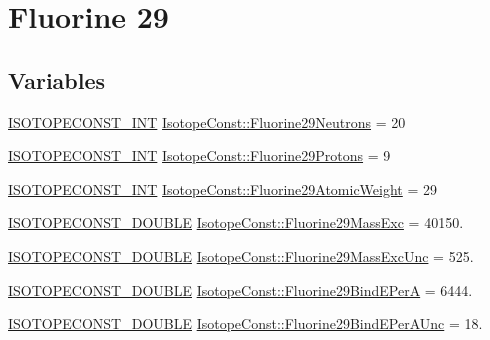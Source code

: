 \hypertarget{group___isotope_const-_fluorine-_f29}{}\section{Fluorine 29}
\label{group___isotope_const-_fluorine-_f29}
\subsection*{Variables}
\begin{DoxyCompactItemize}
\item 
\mbox{\hyperlink{group___isotope_const-_macros_ga5f18360b3e99483a35c32d789e62621c}{I\+S\+O\+T\+O\+P\+E\+C\+O\+N\+S\+T\+\_\+\+I\+NT}} \mbox{\hyperlink{group___isotope_const-_fluorine-_f29_gabb861ae33edf155036f3ac85b320b2b1}{Isotope\+Const\+::\+Fluorine29\+Neutrons}} = 20
\item 
\mbox{\hyperlink{group___isotope_const-_macros_ga5f18360b3e99483a35c32d789e62621c}{I\+S\+O\+T\+O\+P\+E\+C\+O\+N\+S\+T\+\_\+\+I\+NT}} \mbox{\hyperlink{group___isotope_const-_fluorine-_f29_ga0be1a9e6ca769c463c140b2ce1aa0b9f}{Isotope\+Const\+::\+Fluorine29\+Protons}} = 9
\item 
\mbox{\hyperlink{group___isotope_const-_macros_ga5f18360b3e99483a35c32d789e62621c}{I\+S\+O\+T\+O\+P\+E\+C\+O\+N\+S\+T\+\_\+\+I\+NT}} \mbox{\hyperlink{group___isotope_const-_fluorine-_f29_gaebb82f2e96cb5b3251f796ab190d8583}{Isotope\+Const\+::\+Fluorine29\+Atomic\+Weight}} = 29
\item 
\mbox{\hyperlink{group___isotope_const-_macros_ga8f45a7272ce02c0b4c65c44636ed719a}{I\+S\+O\+T\+O\+P\+E\+C\+O\+N\+S\+T\+\_\+\+D\+O\+U\+B\+LE}} \mbox{\hyperlink{group___isotope_const-_fluorine-_f29_ga1de14b9e615760831c29ec09079b2bb9}{Isotope\+Const\+::\+Fluorine29\+Mass\+Exc}} = 40150.
\item 
\mbox{\hyperlink{group___isotope_const-_macros_ga8f45a7272ce02c0b4c65c44636ed719a}{I\+S\+O\+T\+O\+P\+E\+C\+O\+N\+S\+T\+\_\+\+D\+O\+U\+B\+LE}} \mbox{\hyperlink{group___isotope_const-_fluorine-_f29_ga5bf36ee6493c48768cc974720fd146b3}{Isotope\+Const\+::\+Fluorine29\+Mass\+Exc\+Unc}} = 525.
\item 
\mbox{\hyperlink{group___isotope_const-_macros_ga8f45a7272ce02c0b4c65c44636ed719a}{I\+S\+O\+T\+O\+P\+E\+C\+O\+N\+S\+T\+\_\+\+D\+O\+U\+B\+LE}} \mbox{\hyperlink{group___isotope_const-_fluorine-_f29_gaa74e02ec1350b7b015787a8d9c593d8a}{Isotope\+Const\+::\+Fluorine29\+Bind\+E\+PerA}} = 6444.
\item 
\mbox{\hyperlink{group___isotope_const-_macros_ga8f45a7272ce02c0b4c65c44636ed719a}{I\+S\+O\+T\+O\+P\+E\+C\+O\+N\+S\+T\+\_\+\+D\+O\+U\+B\+LE}} \mbox{\hyperlink{group___isotope_const-_fluorine-_f29_gac4ccb702846f31df9ce16fba073f84d5}{Isotope\+Const\+::\+Fluorine29\+Bind\+E\+Per\+A\+Unc}} = 18.

\end{DoxyCompactItemize}
